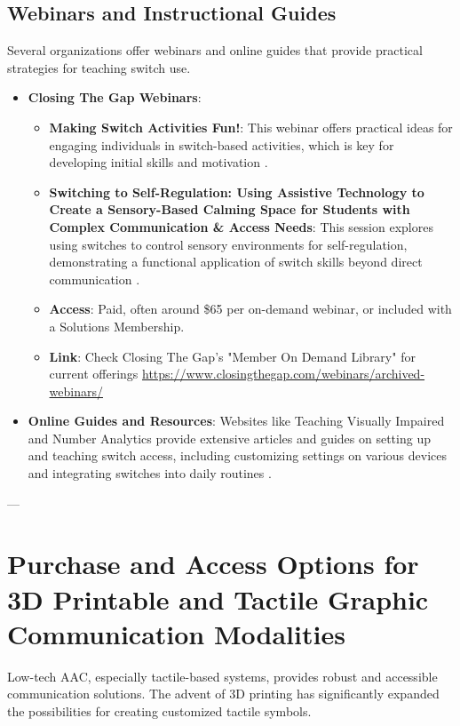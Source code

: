 \subsection{Webinars and Instructional Guides}
Several organizations offer webinars and online guides that provide practical strategies for teaching switch use.
\begin{itemize}
    \item \textbf{Closing The Gap Webinars}:
    \begin{itemize}
        \item \textbf{Making Switch Activities Fun!}: This webinar offers practical ideas for engaging individuals in switch-based activities, which is key for developing initial skills and motivation  \cite{CTG_Fun}.
        \item \textbf{Switching to Self-Regulation: Using Assistive Technology to Create a Sensory-Based Calming Space for Students with Complex Communication \& Access Needs}: This session explores using switches to control sensory environments for self-regulation, demonstrating a functional application of switch skills beyond direct communication  \cite{CTG_SelfRegulation}.
        \item \textbf{Access}: Paid, often around \$65 per on-demand webinar, or included with a Solutions Membership.
        \item \textbf{Link}: Check Closing The Gap's "Member On Demand Library" for current offerings \url{https://www.closingthegap.com/webinars/archived-webinars/}
    \end{itemize}
    \item \textbf{Online Guides and Resources}: Websites like Teaching Visually Impaired and Number Analytics provide extensive articles and guides on setting up and teaching switch access, including customizing settings on various devices and integrating switches into daily routines  \cite{TeachingVI_Switches, NumberAnalytics_Switches}.
\end{itemize}

---

\section{Purchase and Access Options for 3D Printable and Tactile Graphic Communication Modalities}
Low-tech AAC, especially tactile-based systems, provides robust and accessible communication solutions. The advent of 3D printing has significantly expanded the possibilities for creating customized tactile symbols.

